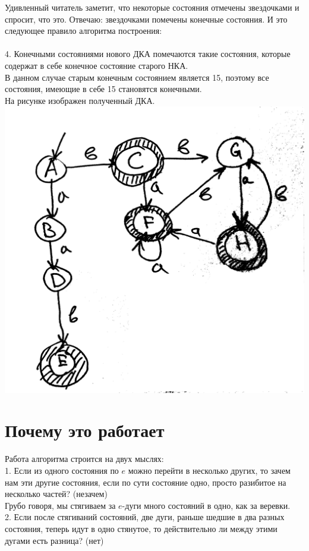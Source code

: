 \documentclass[14pt]{extreport}
\begin{document}
	Удивленный читатель заметит, что некоторые состояния отмечены звездочками и
	спросит, что это. Отвечаю: звездочками помечены конечные состояния. И это следующее
	правило алгоритма построения:\\\\
	4. Конечными состояниями нового ДКА помечаются такие состояния, которые содержат в себе
	конечное состояние старого НКА.\\
	В данном случае старым конечным состоянием является 15, поэтому все состояния, имеющие в себе
	15 становятся конечными.\\
	На рисунке изображен полученный ДКА.\\
	\includegraphics[scale=0.11]{data/pic2_2.png}\\
	\section{Почему это работает}
	Работа алгоритма строится на двух мыслях:\\
	1. Если из одного состояния по $e$ можно перейти в несколько других,
	то зачем нам эти другие состояния, если по сути состояние одно, просто
	разибитое на несколько частей? (незачем)\\
	Грубо говоря, мы стягиваем за $e$-дуги много состояний в одно, как за веревки.\\
	2. Если после стягиваний состояний, две дуги, раньше шедшие в два разных состояния,
	теперь идут в одно стянутое, то действительно ли между этими дугами есть разница? (нет)\\
	\newpage
\end{document}
